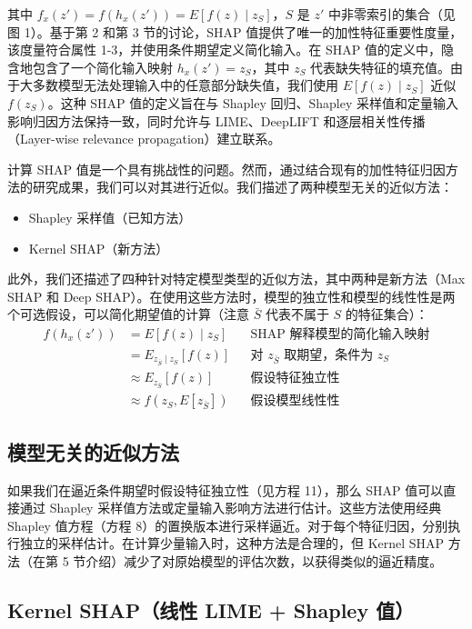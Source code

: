 \documentclass[12pt, a4paper]{ctexart} %
\begin{document}
\noindent 其中 $f_x(z') = f(h_x(z')) = E[f(z) \mid z_S]$，$S$ 是 $z'$ 中非零索引的集合（见图 1）。基于第 2 和第 3 节的讨论，SHAP 值提供了唯一的加性特征重要性度量，该度量符合属性 1-3，并使用条件期望定义简化输入。在 SHAP 值的定义中，隐含地包含了一个简化输入映射 $h_x(z') = z_S$，其中 $z_S$ 代表缺失特征的填充值。由于大多数模型无法处理输入中的任意部分缺失值，我们使用 $E[f(z) \mid z_S]$ 近似 $f(z_S)$。这种 SHAP 值的定义旨在与 Shapley 回归、Shapley 采样值和定量输入影响归因方法保持一致，同时允许与 LIME、DeepLIFT 和逐层相关性传播（Layer-wise relevance propagation）建立联系。

计算 SHAP 值是一个具有挑战性的问题。然而，通过结合现有的加性特征归因方法的研究成果，我们可以对其进行近似。我们描述了两种模型无关的近似方法：
\begin{itemize}
    \item Shapley 采样值（已知方法）
    \item Kernel SHAP（新方法）
\end{itemize}
此外，我们还描述了四种针对特定模型类型的近似方法，其中两种是新方法（Max SHAP 和 Deep SHAP）。在使用这些方法时，模型的独立性和模型的线性性是两个可选假设，可以简化期望值的计算（注意 $\bar{S}$ 代表不属于 $S$ 的特征集合）：
\begin{align}
    f(h_x(z')) &= E[f(z) \mid z_S]  && \text{SHAP 解释模型的简化输入映射}  \tag{9} \\
               &= E_{z_{\bar{S}} \mid z_S} [f(z)]  && \text{对 $z_{\bar{S}}$ 取期望，条件为 $z_S$}  \tag{10} \\
               &\approx E_{z_{\bar{S}}} [f(z)]  && \text{假设特征独立性}  \tag{11} \\
               &\approx f(z_S, E[z_{\bar{S}}])  && \text{假设模型线性性}  \tag{12}
\end{align}

\subsection{模型无关的近似方法}

如果我们在逼近条件期望时假设特征独立性（见方程 11），那么 SHAP 值可以直接通过 Shapley 采样值方法或定量输入影响方法进行估计。这些方法使用经典 Shapley 值方程（方程 8）的置换版本进行采样逼近。对于每个特征归因，分别执行独立的采样估计。在计算少量输入时，这种方法是合理的，但 Kernel SHAP 方法（在第 5 节介绍）减少了对原始模型的评估次数，以获得类似的逼近精度。

\subsection*{Kernel SHAP（线性 LIME + Shapley 值）}
\end{document}
